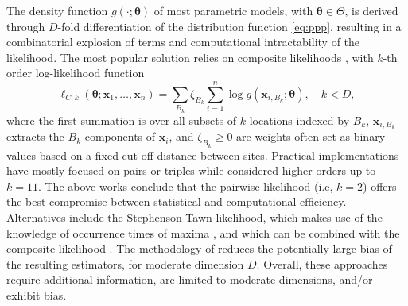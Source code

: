 \documentclass[12pt]{article}
\begin{document}
The density function $g(\cdot;\bm \theta)$ of most parametric models, with 
$\bm \theta \in \Theta$, is derived through $D$-fold differentiation of the distribution function \eqref{eq:ppp}, 
resulting
in a combinatorial explosion of terms and computational intractability of the likelihood. The most popular solution relies on composite likelihoods \citep{Padoan.etal:2010, Sang.Genton:2014}, with $k$-th order log-likelihood function 
%
\begin{equation}
\label{eq:composite}
\ell_{C;k}(\bm \theta;\bm x_1,\dots,\bm x_n)
=\sum_{B_k} \zeta_{B_k} \sum_{i=1}^n\log g(\bm x_{i,B_k};\bm \theta), \quad k< D,
\end{equation}
%
where the first summation is over all subsets of $k$ locations indexed by $B_k$, $\bm x_{i,B_k}$ extracts the $B_k$ components of $\bm x_i$, and $\zeta_{B_k} \geq 0$ are weights often set as binary values based on a fixed cut-off distance between sites. 
Practical implementations have mostly focused on pairs or triples \citep{Padoan.etal:2010, Huser.Davison:2013a} while \citet{Castruccio.etal:2016} considered higher orders up to $k=11$. The above works conclude that the pairwise likelihood (i.e, $k=2$) offers the best compromise between statistical and computational efficiency.
Alternatives include the Stephenson-Tawn likelihood, which makes use of the knowledge of occurrence times of maxima 
\citep{Stephenson.Tawn:2005, Wadsworth.Tawn:2014}, and which can be combined with the composite likelihood \citep{Beranger.etal:2021}. The methodology of \citet{Wadsworth:2015} reduces the potentially large bias of the resulting estimators, for moderate dimension $D$. Overall, these approaches require additional information, are limited to moderate dimensions, and/or exhibit bias.
\end{document}
